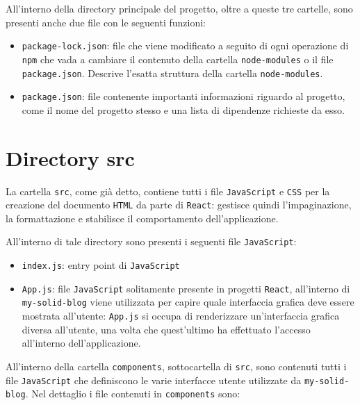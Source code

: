 \medskip

All'interno della directory principale del progetto, oltre a queste tre cartelle, sono presenti anche due file con le seguenti funzioni:

\begin{itemize}
	\item {\tt package-lock.json}: file che viene modificato a seguito di ogni operazione di {\tt npm} che vada a cambiare il contenuto della cartella {\tt node-modules} o il file {\tt package.json}. Descrive l'esatta struttura della cartella {\tt node-modules}.
	\item {\tt package.json}: file contenente importanti informazioni riguardo al progetto, come il nome del progetto stesso e una lista di dipendenze richieste da esso.
\end{itemize}

\bigskip

\section{Directory src}

\medskip

La cartella {\tt src}, come già detto, contiene tutti i file {\tt JavaScript} e {\tt CSS} per la creazione del documento {\tt HTML} da parte di {\tt React}: gestisce quindi l'impaginazione, la formattazione e stabilisce il comportamento dell'applicazione.

\medskip

All'interno di tale directory sono presenti i seguenti file {\tt JavaScript}:

\begin{itemize}
	\item {\tt index.js}: entry point di {\tt JavaScript}
	\item {\tt App.js}: file {\tt JavaScript} solitamente presente in progetti {\tt React}, all'interno di {\tt my-solid-blog} viene utilizzata per capire quale interfaccia grafica deve essere mostrata all'utente: {\tt App.js} si occupa di renderizzare un'interfaccia grafica diversa all'utente, una volta che quest'ultimo ha effettuato l'accesso all'interno dell'applicazione.
\end{itemize}

\medskip 

All'interno della cartella {\tt components}, sottocartella di {\tt src}, sono contenuti tutti i file {\tt JavaScript} che definiscono le varie interfacce utente utilizzate da {\tt my-solid-blog}. Nel dettaglio i file contenuti in {\tt components} sono:

